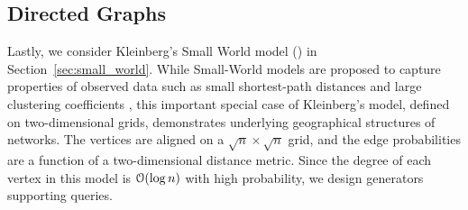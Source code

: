 \subsection{Directed Graphs}
\label{sec:directed_graphs}
Lastly, we consider Kleinberg's Small World model (\cite{kleinberg, klein}) in Section~\ref{sec:small_world}.
While Small-World models are proposed to capture 
properties of observed data such as small shortest-path 
distances and large clustering coefficients \cite{watts1998collective}, 
this important special case of Kleinberg's model, defined on two-dimensional grids, 
demonstrates underlying geographical structures of networks. 
The vertices are aligned on a $\sqrt{n}\times\sqrt{n}$ grid,
and the edge probabilities are a function of a two-dimensional distance metric.
Since the degree of each vertex in this model is $\Bo(\log n)$ with high probability,
we design generators supporting  queries.
